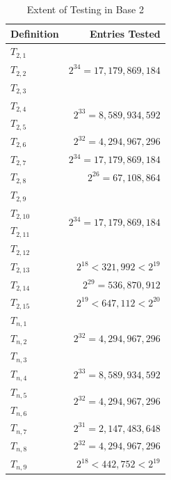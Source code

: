 \documentclass[conference]{IEEEtran}
\begin{document}
\renewcommand{\arraystretch}{1.25}
\begin{table}[H]
\label{tab:testing_b2}
\caption{Extent of Testing in Base 2}
\centering
\begin{tabular}{|l|r|}
\hline
\textbf{Definition} & \textbf{Entries Tested}      \\ \hline
$T_{2,1}$  &\multirow{3}{*}{$2^{34}=17,179,869,184$}\\ \cline{1-1}
$T_{2,2}$  &                              \\ \cline{1-1}
$T_{2,3}$  &                              \\ \hline
$T_{2,4}$  &\multirow{2}{*}{$2^{33}=8,589,934,592$}\\ \cline{1-1}
$T_{2,5}$  &                              \\ \hline
$T_{2,6}$  & $2^{32} = 4,294,967,296$     \\ \hline
$T_{2,7}$  & $2^{34} = 17,179,869,184$    \\ \hline
$T_{2,8}$  & $2^{26} = 67,108,864$        \\ \hline
$T_{2,9}$  &\multirow{4}{*}{$2^{34}=17,179,869,184$}\\ \cline{1-1}
$T_{2,10}$ &                              \\ \cline{1-1}
$T_{2,11}$ &                              \\ \cline{1-1}
$T_{2,12}$ &                              \\ \hline
$T_{2,13}$ & $2^{18} < 321,992 < 2^{19}$  \\ \hline
$T_{2,14}$ & $2^{29} = 536,870,912$       \\ \hline
$T_{2,15}$ & $2^{19} < 647,112 < 2^{20}$  \\ \hline
$T_{n,1}$  &\multirow{3}{*}{$2^{32}=4,294,967,296$}\\ \cline{1-1}
$T_{n,2}$  &                              \\ \cline{1-1}
$T_{n,3}$  &                              \\ \hline
$T_{n,4}$  & $2^{33} = 8,589,934,592$     \\ \hline
$T_{n,5}$  &\multirow{2}{*}{$2^{32}=4,294,967,296$}\\ \cline{1-1}
$T_{n,6}$  &                              \\ \hline
$T_{n,7}$  & $2^{31} = 2,147,483,648$     \\ \hline
$T_{n,8}$  & $2^{32} = 4,294,967,296$     \\ \hline
$T_{n,9}$  & $2^{18} < 442,752 < 2^{19}$  \\ \hline
\end{tabular}
\end{table}
\end{document}
